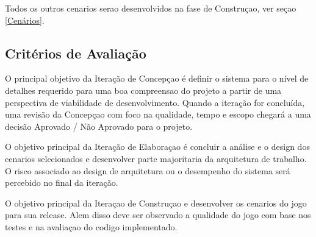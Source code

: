 Todos os outros cenarios serao desenvolvidos na fase de Construçao, ver seçao \ref{Cenários}.

\subsection{Critérios de Avaliação}

O principal objetivo da Iteração de Concepçao é definir o sistema para o nível de detalhes requerido para uma boa compreensao do projeto a partir de uma perspectiva de viabilidade de desenvolvimento. Quando a iteração for concluída, uma revisão da Concepçao com foco na qualidade, tempo e escopo chegará a uma decisão Aprovado / Não Aprovado para o projeto.

O objetivo principal da Iteração de Elaboraçao é concluir a análise e o design dos cenarios selecionados e desenvolver parte majoritaria da arquitetura de trabalho. O risco associado ao design de arquitetura ou o desempenho do sistema será percebido no final da iteração. 

O objetivo principal da Iteraçao de Construçao e desenvolver os cenarios do jogo para sua release. Alem disso deve ser observado a qualidade do jogo com base nos testes e na avaliaçao do codigo implementado.
